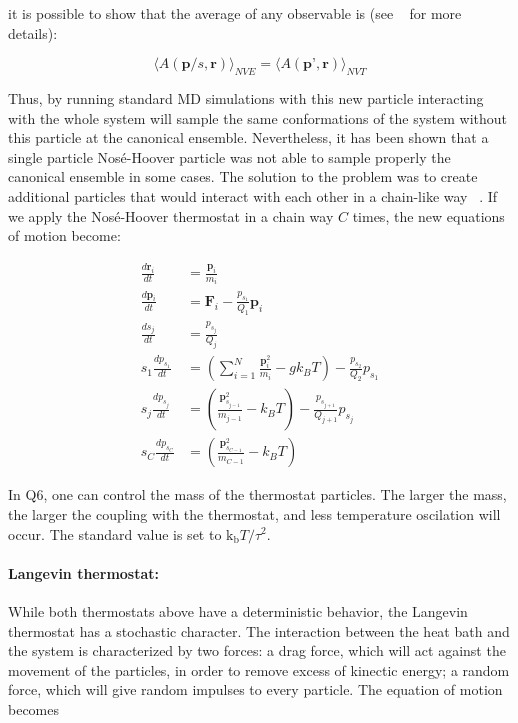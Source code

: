 \documentclass[a4paper,11pt]{article}
\let\origcite\cite
\def\cite#1{\unskip~\origcite{#1}}
\begin{document}
it is possible to show that the average of any observable is (see \cite{Frenkel:1996} for more details):

\begin{equation}
 \langle A(\textbf{p}/s,\textbf{r}) \rangle_{NVE} = \langle A(\textbf{p'},\textbf{r}) \rangle_{NVT}
\end{equation}

Thus, by running standard MD simulations with this new particle interacting
with the whole system will sample the same conformations of the system without
this particle at the canonical ensemble. Nevertheless, it has been shown that a
single particle Nos\'e-Hoover particle was not able to sample properly
the canonical ensemble in some cases. The solution to the problem was
to create additional particles that would interact with each other in a
chain-like way \cite{Martyna1992}. If we apply the Nos\'e-Hoover
thermostat in a chain way $C$ times, the new equations of motion become:

\begin{align}
 \frac{d\textbf{r}_{i}}{dt} &= \frac{\textbf{p}_{i}}{m_{i}} \\
 \frac{d\textbf{p}_{i}}{dt} &= \textbf{F}_{i} -  \frac{p_{{s}_{1}}}{Q_{1}}
 \textbf{p}_{i} \\
 \frac{ds_{j}}{dt} &= \frac{p_{{s}_{j}}}{Q_{j}} \\
 s_{1}\frac{dp_{{s}_{1}}}{dt} &= \left(\sum_{i=1}^N \frac{\textbf{p}_{i}^2}{m_{i}}
  -gk_{B}T \right) - \frac{p_{{s}_{2}}}{Q_{2}}p_{{s}_{1}} \\
 s_{j}\frac{dp_{{s}_{j}}}{dt} &= \left(\frac{\textbf{p}_{s_{j-1}}^2}{m_{j-1}}
  -k_{B}T \right) - \frac{p_{{s}_{j+1}}}{Q_{j+1}}p_{{s}_{j}} \\
 s_{C}\frac{dp_{{s}_{C}}}{dt} &= \left(\frac{\textbf{p}_{s_{C-1}}^2}{m_{C-1}}
  -k_{B}T \right)
\end{align}

In Q6, one can control the mass of the thermostat particles. The larger the mass,
the larger the coupling with the thermostat, and less temperature oscilation will
occur. The standard value is set to $\text{k}_{\text{b}}T/{{\tau}^{2}}$.

\paragraph{Langevin thermostat:}

While both thermostats above have a deterministic behavior, the Langevin
 thermostat has a stochastic character. The interaction between the heat
bath and the system is characterized by two forces: a drag force, which will
act against the movement of the particles, in order to remove excess of
kinectic energy; a random force, which will give random impulses to every
particle. The equation of motion becomes
\end{document}
